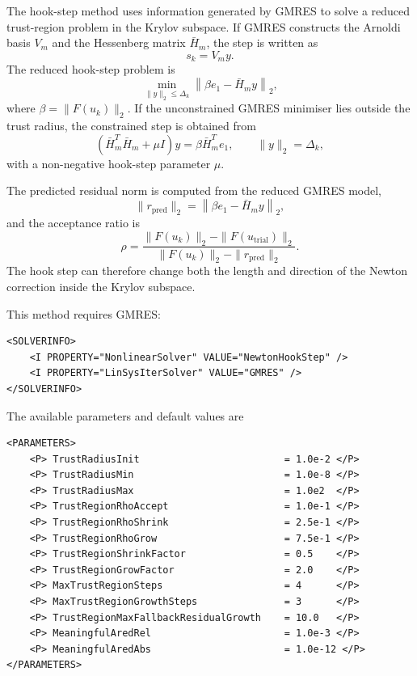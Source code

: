 The hook-step method uses information generated by GMRES to solve a reduced
trust-region problem in the Krylov subspace. If GMRES constructs the Arnoldi
basis $V_m$ and the Hessenberg matrix $\bar{H}_m$, the step is written as
$$
    s_k = V_m y.
$$
The reduced hook-step problem is
$$
    \min_{\|y\|_2 \leq \Delta_k}
    \left\|
        \beta e_1 - \bar{H}_m y
    \right\|_2,
$$
where $\beta = \|F(u_k)\|_2$. If the unconstrained GMRES minimiser lies outside
the trust radius, the constrained step is obtained from
$$
    \left(\bar{H}_m^T\bar{H}_m + \mu I\right)y
    =
    \beta \bar{H}_m^T e_1,
    \qquad
    \|y\|_2 = \Delta_k,
$$
with a non-negative hook-step parameter $\mu$.

The predicted residual norm is computed from the reduced GMRES model,
$$
    \|r_{\mathrm{pred}}\|_2
    =
    \left\|
        \beta e_1 - \bar{H}_m y
    \right\|_2,
$$
and the acceptance ratio is
$$
    \rho =
    \frac{
        \|F(u_k)\|_2 - \|F(u_{\mathrm{trial}})\|_2
    }{
        \|F(u_k)\|_2 - \|r_{\mathrm{pred}}\|_2
    }.
$$
The hook step can therefore change both the length and direction of the Newton
correction inside the Krylov subspace.

This method requires GMRES:
\begin{lstlisting}[style=XMLStyle]
<SOLVERINFO>
    <I PROPERTY="NonlinearSolver" VALUE="NewtonHookStep" />
    <I PROPERTY="LinSysIterSolver" VALUE="GMRES" />
</SOLVERINFO>
\end{lstlisting}

The available parameters and default values are
\begin{lstlisting}[style=XMLStyle]
<PARAMETERS>
    <P> TrustRadiusInit                         = 1.0e-2 </P>
    <P> TrustRadiusMin                          = 1.0e-8 </P>
    <P> TrustRadiusMax                          = 1.0e2  </P>
    <P> TrustRegionRhoAccept                    = 1.0e-1 </P>
    <P> TrustRegionRhoShrink                    = 2.5e-1 </P>
    <P> TrustRegionRhoGrow                      = 7.5e-1 </P>
    <P> TrustRegionShrinkFactor                 = 0.5    </P>
    <P> TrustRegionGrowFactor                   = 2.0    </P>
    <P> MaxTrustRegionSteps                     = 4      </P>
    <P> MaxTrustRegionGrowthSteps               = 3      </P>
    <P> TrustRegionMaxFallbackResidualGrowth    = 10.0   </P>
    <P> MeaningfulAredRel                       = 1.0e-3 </P>
    <P> MeaningfulAredAbs                       = 1.0e-12 </P>
</PARAMETERS>
\end{lstlisting}


